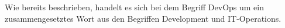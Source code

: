 Wie bereits beschrieben, handelt es sich bei dem Begriff DevOps um ein zusammengesetztes Wort aus den Begriffen Development und IT-Operations. 